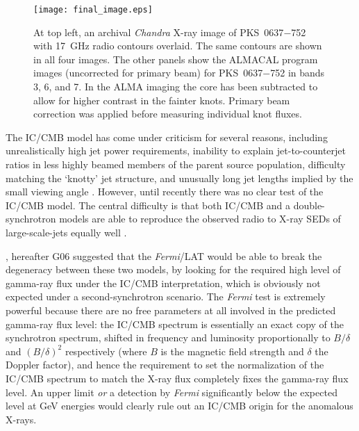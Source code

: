 \documentclass[twocolumn]{aastex61}
\begin{document}
\begin{figure*}[ht]
\vspace{20pt}
\begin{center}
\texttt{[image: final\_image.eps]}
\end{center}
\caption{\label{fig:imaging} At top left, an archival \emph{Chandra}
  X-ray image of PKS~0637$-$752 with 17~GHz radio contours
  \citep{godfrey2012} overlaid. The same contours are shown in all
  four images. The other panels show the ALMACAL program images
  (uncorrected for primary beam) for PKS~0637$-$752 in bands 3, 6, and
  7. In the ALMA imaging the core has been subtracted to allow for
  higher contrast in the fainter knots. Primary beam correction was
  applied before measuring individual knot fluxes. 
}
\end{figure*}

The IC/CMB model has come under criticism for several reasons,
including unrealistically high jet power requirements, inability to
explain jet-to-counterjet ratios in less highly beamed members of the
parent source population, difficulty matching the `knotty' jet
structure, and unusually long jet lengths implied by the small viewing
angle
\citep{dermer2004,jorstad2004,uchiyama2006,hardcastle2006,hardcastle2016}. However,
until recently there was no clear test of the IC/CMB model. The central difficulty is that both
IC/CMB and a double-synchrotron models are able to reproduce the
observed radio to X-ray SEDs of large-scale-jets equally well
\citep[e.g., see direct comparison in ][]{cara2013}.

\citet[][]{georganopoulos2006}, hereafter G06 suggested that the
\emph{Fermi}/LAT would be able to break the degeneracy between these
two models, by looking for the required high level of gamma-ray flux
under the IC/CMB interpretation, which is obviously not expected under
a second-synchrotron scenario. The \emph{Fermi} test is extremely
powerful because there are no free parameters at all involved in the
predicted gamma-ray flux level: the IC/CMB spectrum is essentially an
exact copy of the synchrotron spectrum, shifted in frequency and
luminosity proportionally to $B/\delta$ and $(B/\delta)^2$
respectively (where $B$ is the magnetic field strength and $\delta$
the Doppler factor), and hence the requirement to set the
normalization of the IC/CMB spectrum to match the X-ray flux
completely fixes the gamma-ray flux level. An upper limit \emph{or} a
detection by \emph{Fermi} significantly below the expected level at
GeV energies would clearly rule out an IC/CMB origin for the anomalous
X-rays. 
\end{document}

